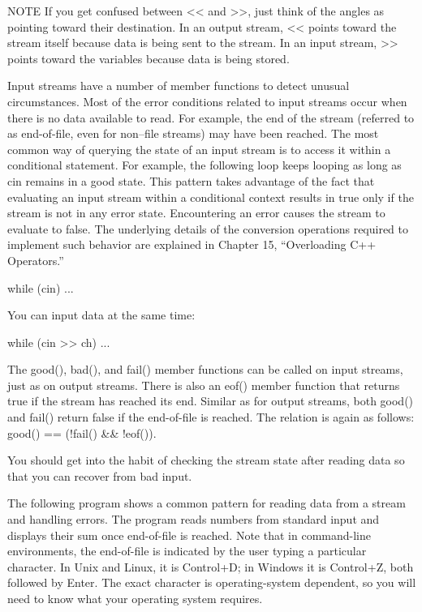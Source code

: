 \begin{myNotic}{NOTE}
If you get confused between <{}< and >{}>, just think of the angles as pointing toward their destination. In an output stream, <{}< points toward the stream itself because data is being sent to the stream. In an input stream, >{}> points toward the variables because data is being stored.
\end{myNotic}


Input streams have a number of member functions to detect unusual circumstances. Most of the error conditions related to input streams occur when there is no data available to read. For example, the end of the stream (referred to as end-of-file, even for non–file streams) may have been reached. The most common way of querying the state of an input stream is to access it within a conditional statement. For example, the following loop keeps looping as long as cin remains in a good state. This pattern takes advantage of the fact that evaluating an input stream within a conditional context results in true only if the stream is not in any error state. Encountering an error causes the stream to evaluate to false. The underlying details of the conversion operations required to implement such behavior are explained in Chapter 15, “Overloading C++ Operators.”

\begin{cpp}
while (cin) { ... }
\end{cpp}

You can input data at the same time:

\begin{cpp}
while (cin >> ch) { ... }
\end{cpp}

The good(), bad(), and fail() member functions can be called on input streams, just as on output streams. There is also an eof() member function that returns true if the stream has reached its end. Similar as for output streams, both good() and fail() return false if the end-of-file is reached. The relation is again as follows: good() == (!fail() \&\& !eof()).

You should get into the habit of checking the stream state after reading data so that you can recover from bad input.

The following program shows a common pattern for reading data from a stream and handling errors. The program reads numbers from standard input and displays their sum once end-of-file is reached. Note that in command-line environments, the end-of-file is indicated by the user typing a particular character. In Unix and Linux, it is Control+D; in Windows it is Control+Z, both followed by Enter. The exact character is operating-system dependent, so you will need to know what your operating system requires.

